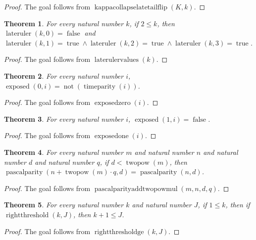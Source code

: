 \documentclass[11pt]{article}
\newtheorem{theorem}{Theorem}[section]
\theoremstyle{definition}
\begin{document}
\begin{proof}
The goal follows from \(\operatorname{kappacollapselatetailflip}(K, k)\).
\end{proof}
\begin{theorem}
\label{ll:observations:late-ruler-values}
For every natural number \(k\), if \(2 \le k\), then \(\operatorname{lateruler}(k, 0) = \operatorname{false}\) and \(\operatorname{lateruler}(k, 1) = \operatorname{true} \land \operatorname{lateruler}(k, 2) = \operatorname{true} \land \operatorname{lateruler}(k, 3) = \operatorname{true}\).
\end{theorem}
\begin{proof}
The goal follows from \(\operatorname{laterulervalues}(k)\).
\end{proof}
\begin{theorem}
\label{ll:observations:exposed-zero}
For every natural number \(i\), \(\operatorname{exposed}(0, i) = \operatorname{not}(\operatorname{timeparity}(i))\).
\end{theorem}
\begin{proof}
The goal follows from \(\operatorname{exposedzero}(i)\).
\end{proof}
\begin{theorem}
\label{ll:observations:exposed-one}
For every natural number \(i\), \(\operatorname{exposed}(1, i) = \operatorname{false}\).
\end{theorem}
\begin{proof}
The goal follows from \(\operatorname{exposedone}(i)\).
\end{proof}
\begin{theorem}
\label{ll:observations:pascal-parity-add-twopow-mul}
For every natural number \(m\) and natural number \(n\) and natural number \(d\) and natural number \(q\), if \(d < \operatorname{twopow}(m)\), then \(\operatorname{pascalparity}(n + \operatorname{twopow}(m) \cdot q, d) = \operatorname{pascalparity}(n, d)\).
\end{theorem}
\begin{proof}
The goal follows from \(\operatorname{pascalparityaddtwopowmul}(m, n, d, q)\).
\end{proof}
\begin{theorem}
\label{ll:observations:right-threshold-ge}
For every natural number \(k\) and natural number \(J\), if \(1 \le k\), then if \(\operatorname{rightthreshold}(k, J)\), then \(k + 1 \le J\).
\end{theorem}
\begin{proof}
The goal follows from \(\operatorname{rightthresholdge}(k, J)\).
\end{proof}
\end{document}
